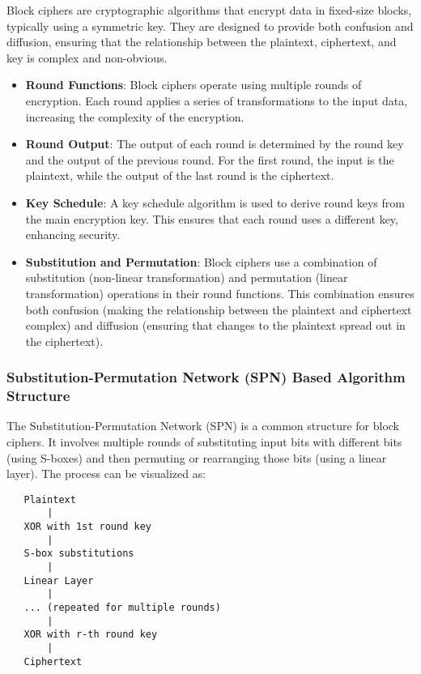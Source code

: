 \documentclass[12pt]{article}
\begin{document}
Block ciphers are cryptographic algorithms that encrypt data in fixed-size blocks, typically using a symmetric key. They are designed to provide both confusion and diffusion, ensuring that the relationship between the plaintext, ciphertext, and key is complex and non-obvious.

\begin{itemize}
    \item \textbf{Round Functions}: Block ciphers operate using multiple rounds of encryption. Each round applies a series of transformations to the input data, increasing the complexity of the encryption.

    \item \textbf{Round Output}: The output of each round is determined by the round key and the output of the previous round. For the first round, the input is the plaintext, while the output of the last round is the ciphertext.

    \item \textbf{Key Schedule}: A key schedule algorithm is used to derive round keys from the main encryption key. This ensures that each round uses a different key, enhancing security.

    \item \textbf{Substitution and Permutation}: Block ciphers use a combination of substitution (non-linear transformation) and permutation (linear transformation) operations in their round functions. This combination ensures both confusion (making the relationship between the plaintext and ciphertext complex) and diffusion (ensuring that changes to the plaintext spread out in the ciphertext).
\end{itemize}

\subsubsection*{Substitution-Permutation Network (SPN) Based Algorithm Structure}

The Substitution-Permutation Network (SPN) is a common structure for block ciphers. It involves multiple rounds of substituting input bits with different bits (using S-boxes) and then permuting or rearranging those bits (using a linear layer). The process can be visualized as:

\begin{verbatim}
   Plaintext
       |
   XOR with 1st round key
       |
   S-box substitutions
       |
   Linear Layer
       |
   ... (repeated for multiple rounds)
       |
   XOR with r-th round key
       |
   Ciphertext
\end{verbatim}
\end{document}
